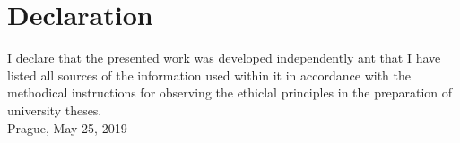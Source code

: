 \null\vfill{}
\section*{Declaration}
I declare that the presented work was developed independently ant that I have listed all sources of the information used within it in accordance with the methodical instructions for observing the ethiclal principles in the preparation of university theses.\\[0.5cm]

Prague, May 25, 2019 
\bigskip
\bigskip
\bigskip 

\begin{flushright}  

 \begin{minipage}{0.35\textwidth} 
  \centering   
  \dotfill\\   
 \end{minipage}
\end{flushright}